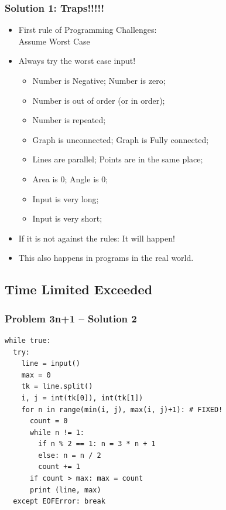 \documentclass{beamer}
\begin{document}
\begin{frame}
  \frametitle{Solution 1: Traps!!!!!}

  \begin{itemize}
    \item First rule of Programming Challenges: \\ \hspace{1cm}\alert{Assume Worst Case}
    \item Always try the worst case input!

    \bigskip

    \begin{itemize}
      \item Number is Negative; Number is zero;
      \item Number is out of order (or in order);
      \item Number is repeated;
      \smallskip

      \item Graph is unconnected; Graph is Fully connected;
      \item Lines are parallel; Points are in the same place;
      \item Area is 0; Angle is 0;
      \smallskip

      \item Input is very long;
      \item Input is very short;
    \end{itemize}
    \bigskip

    \item If it is not against the rules: \alert{It will happen!}
    \item This also happens in programs in the real world.
  \end{itemize}
\end{frame}

\subsection{Time Limited Exceeded}

\begin{frame}[fragile]
  \frametitle{Problem 3n+1 -- Solution 2}
\begin{verbatim}
while true:
  try:
    line = input()
    max = 0
    tk = line.split()
    i, j = int(tk[0]), int(tk[1])
    for n in range(min(i, j), max(i, j)+1): # FIXED!
      count = 0
      while n != 1:
        if n % 2 == 1: n = 3 * n + 1
        else: n = n / 2
        count += 1
      if count > max: max = count
      print (line, max)
  except EOFError: break
\end{verbatim}
\end{frame}
\end{document}
